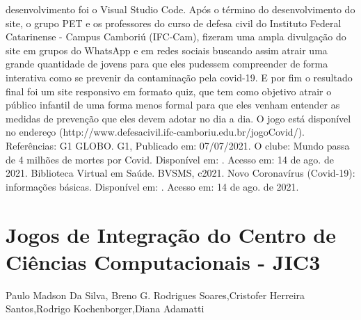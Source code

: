 desenvolvimento foi o Visual Studio Code.
Após o término do desenvolvimento do site, o grupo PET e os professores do curso de 
defesa civil do Instituto Federal Catarinense - Campus Camboriú (IFC-Cam), fizeram uma ampla 
divulgação do site em grupos do WhatsApp e em redes sociais buscando assim atrair uma grande 
quantidade de jovens para que eles pudessem compreender de forma interativa como se prevenir 
da contaminação pela covid-19. 
E por fim o resultado final foi um site responsivo em formato quiz, que tem como objetivo 
atrair o público infantil de uma forma menos formal para que eles venham entender as medidas de 
prevenção que eles devem adotar no dia a dia. O jogo está disponível no endereço 
(http://www.defesacivil.ifc-camboriu.edu.br/jogoCovid/).
Referências:
G1 GLOBO. G1, Publicado em: 07/07/2021. O clube: Mundo passa de 4 milhões de mortes por Covid. 
Disponível em: . Acesso em: 14 de ago. de 2021.
Biblioteca Virtual em Saúde. BVSMS, c2021. Novo Coronavírus (Covid-19): informações básicas. 
Disponível em: . Acesso 
em: 14 de ago. de 2021.



\section{Jogos de Integração do Centro de Ciências Computacionais - JIC3}

Paulo Madson Da Silva, Breno G. Rodrigues Soares,Cristofer Herreira Santos,Rodrigo Kochenborger,Diana Adamatti

